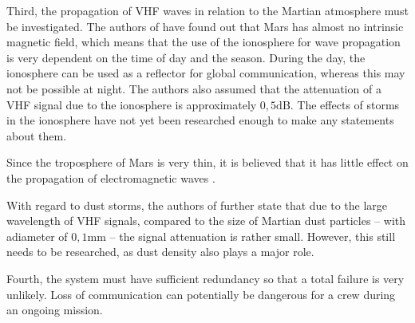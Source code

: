 Third, the propagation of VHF waves in relation to the Martian atmosphere must be investigated. The authors of \cite{Ho:2002} have found out that Mars has almost no intrinsic magnetic field, which means that the use of the ionosphere for wave propagation is very dependent on the time of day and the season. During the day, the ionosphere can be used as a reflector for global communication, whereas this may not be possible at night. The authors also assumed that the attenuation of a VHF signal due to the ionosphere is approximately $0,5\mathrm{dB}$. The effects of storms in the ionosphere have not yet been researched enough to make any statements about them.

Since the troposphere of Mars is very thin, it is believed that it has little effect on the propagation of electromagnetic waves \cite{Ho:2002}.

With regard to dust storms, the authors of \cite{Ho:2002} further state that due to the large wavelength of VHF signals, compared to the size of Martian dust particles -- with adiameter of $0,1\mathrm{mm}$ -- the signal attenuation is rather small. However, this still needs to be researched, as dust density also plays a major role. 

Fourth, the system must have sufficient redundancy so that a total failure is very unlikely. Loss of communication can potentially be dangerous for a crew during an ongoing mission. 
